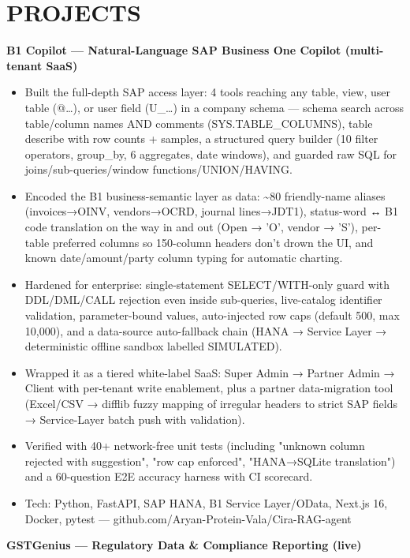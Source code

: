 \documentclass[9pt]{article}
\begin{document}
\section*{PROJECTS}
\textbf{B1 Copilot  ---  Natural-Language SAP Business One Copilot (multi-tenant SaaS)}
\vspace{1pt}
\begin{itemize}[leftmargin=11pt,itemsep=0pt,topsep=1pt,parsep=0pt]
\item Built the full-depth SAP access layer: 4 tools reaching any table, view, user table (@…), or user field (U\_…) in a company schema  ---  schema search across table/column names AND comments (SYS.TABLE\_COLUMNS), table describe with row counts + samples, a structured query builder (10 filter operators, group\_by, 6 aggregates, date windows), and guarded raw SQL for joins/sub-queries/window functions/UNION/HAVING.
\item Encoded the B1 business-semantic layer as data: \textasciitilde{}80 friendly-name aliases (invoices→OINV, vendors→OCRD, journal lines→JDT1), status-word ↔ B1 code translation on the way in and out (Open → 'O', vendor → 'S'), per-table preferred columns so 150-column headers don't drown the UI, and known date/amount/party column typing for automatic charting.
\item Hardened for enterprise: single-statement SELECT/WITH-only guard with DDL/DML/CALL rejection even inside sub-queries, live-catalog identifier validation, parameter-bound values, auto-injected row caps (default 500, max 10,000), and a data-source auto-fallback chain (HANA → Service Layer → deterministic offline sandbox labelled SIMULATED).
\item Wrapped it as a tiered white-label SaaS: Super Admin → Partner Admin → Client with per-tenant write enablement, plus a partner data-migration tool (Excel/CSV → difflib fuzzy mapping of irregular headers to strict SAP fields → Service-Layer batch push with validation).
\item Verified with 40+ network-free unit tests (including "unknown column rejected with suggestion", "row cap enforced", "HANA→SQLite translation") and a 60-question E2E accuracy harness with CI scorecard.
\item Tech: Python, FastAPI, SAP HANA, B1 Service Layer/OData, Next.js 16, Docker, pytest  ---  github.com/Aryan-Protein-Vala/Cira-RAG-agent
\end{itemize}
\textbf{GSTGenius  ---  Regulatory Data \& Compliance Reporting (live)}
\vspace{1pt}
\end{document}
